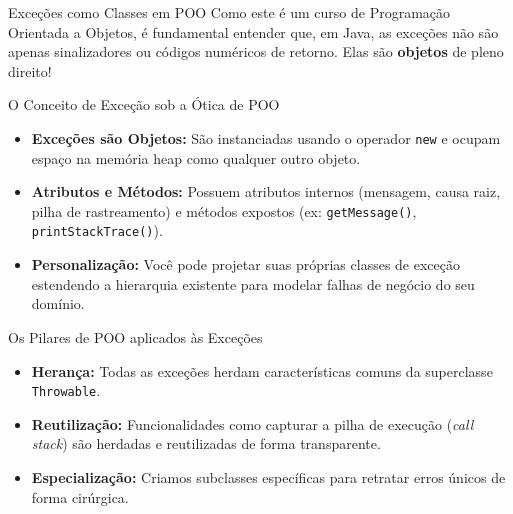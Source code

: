 \documentclass[9pt]{beamer}
\begin{document}
\begin{frame}{Exceções como Classes em POO}
    Como este é um curso de Programação Orientada a Objetos, é fundamental entender que, em Java, as exceções não são apenas sinalizadores ou códigos numéricos de retorno. Elas são \textbf{objetos} de pleno direito!
    
    \vspace{0.2cm}
    
    \begin{block}{O Conceito de Exceção sob a Ótica de POO}
        \begin{itemize}
            \item \textbf{Exceções são Objetos:} São instanciadas usando o operador \texttt{new} e ocupam espaço na memória heap como qualquer outro objeto.
            \item \textbf{Atributos e Métodos:} Possuem atributos internos (mensagem, causa raiz, pilha de rastreamento) e métodos expostos (ex: \texttt{getMessage()}, \texttt{printStackTrace()}).
            \item \textbf{Personalização:} Você pode projetar suas próprias classes de exceção estendendo a hierarquia existente para modelar falhas de negócio do seu domínio.
        \end{itemize}
    \end{block}
    
    \begin{block}{Os Pilares de POO aplicados às Exceções}
        \begin{itemize}
            \item \textbf{Herança:} Todas as exceções herdam características comuns da superclasse \texttt{Throwable}.
            \item \textbf{Reutilização:} Funcionalidades como capturar a pilha de execução (\textit{call stack}) são herdadas e reutilizadas de forma transparente.
            \item \textbf{Especialização:} Criamos subclasses específicas para retratar erros únicos de forma cirúrgica.
        \end{itemize}
    \end{block}
\end{frame}
\end{document}
